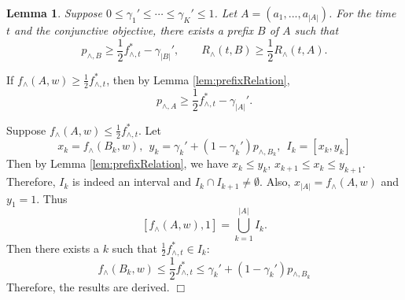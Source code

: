 \documentclass{article}
\newcommand{\abs}[1]{\left| #1 \right|}
\newtheorem{lemma}[theorem]{Lemma}%
\newenvironment{proof}{\noindent {\textbf{Proof. }}}{$\Box$ \medskip}
\begin{document}
\begin{lemma}
Suppose $0 \leq \gamma_1' \leq \cdots \leq \gamma_K' \leq 1$. Let $A = (a_1, ..., a_{\abs{A}})$. For the time $t$ and the conjunctive objective, there exists a prefix $B$ of $A$ such that 
$$
p_{\wedge, B} \geq \frac{1}{2}f_{\wedge, t}^{\ast} - \gamma_{\abs{B}}', \qquad R_{\wedge}(t, B) \geq \frac{1}{2} R_{\wedge}(t, A).
$$ 
\end{lemma}
\begin{proof}
If $f_{\wedge}(A, w) \geq \frac{1}{2} f_{\wedge, t}^{\ast}$, then by Lemma \ref{lem:prefixRelation},
$$
p_{\wedge, A} \geq \frac{1}{2}f_{\wedge, t}^{\ast} - \gamma_{\abs{A}}'.
$$

Suppose $f_{\wedge}(A, w) \leq \frac{1}{2} f_{\wedge, t}^{\ast}$. Let
$$
x_k = f_{\wedge}(B_k,w), ~~ y_k = \gamma_k' + (1 - \gamma_k')p_{\wedge, B_k}, ~~I_k = [x_k, y_k]
$$
Then by Lemma \ref{lem:prefixRelation}, we have $x_k \leq y_k$, $x_{k+1} \leq x_k \leq y_{k+1}$. Therefore, $I_k$ is indeed an interval and $I_k \cap I_{k+1} \neq \emptyset$. Also, $x_{\abs{A}} = f_{\wedge}(A, w)$ and $y_1 = 1$. Thus
$$
[f_{\wedge}(A,w), 1] = \bigcup_{k=1}^{\abs{A}} I_k.
$$
Then there exists a $k$ such that $\frac{1}{2}f_{\wedge, t}^{\ast} \in I_k$:
$$
f_{\wedge}(B_k,w) \leq \frac{1}{2}f_{\wedge, t}^{\ast} \leq \gamma_k' + (1 - \gamma_k')p_{\wedge, B_k}
$$
Therefore, the results are derived.
\end{proof}
\end{document}
